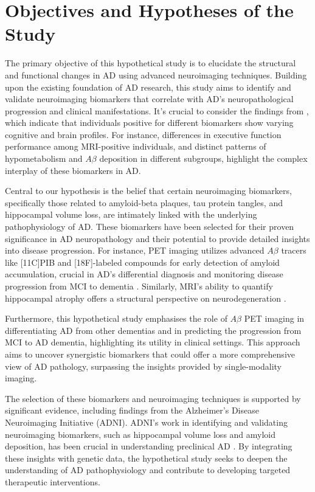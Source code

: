 \documentclass[10pt]{article}
\begin{document}
\begin{sloppypar}
  \section{Objectives and Hypotheses of the Study}
  \label{sec:objectives-and-hypotheses}

  The primary objective of this hypothetical study is to elucidate the structural and functional changes in AD using advanced neuroimaging techniques. Building upon the existing foundation of AD research, this study aims to identify and validate neuroimaging biomarkers that correlate with AD’s neuropathological progression and clinical manifestations. It's crucial to consider the findings from \cite{besson_cognitive_2015}, which indicate that individuals positive for different biomarkers show varying cognitive and brain profiles. For instance, differences in executive function performance among MRI-positive individuals, and distinct patterns of hypometabolism and $A\beta$ deposition in different subgroups, highlight the complex interplay of these biomarkers in AD.

  Central to our hypothesis is the belief that certain neuroimaging biomarkers, specifically those related to amyloid-beta plaques, tau protein tangles, and hippocampal volume loss, are intimately linked with the underlying pathophysiology of AD. These biomarkers have been selected for their proven significance in AD neuropathology and their potential to provide detailed insights into disease progression. For instance, PET imaging utilizes advanced $A\beta$ tracers like [11C]PIB and [18F]-labeled compounds for early detection of amyloid accumulation, crucial in AD's differential diagnosis and monitoring disease progression from MCI to dementia \citep{bao_pet_2021}. Similarly, MRI’s ability to quantify hippocampal atrophy offers a structural perspective on neurodegeneration \citep{besson_cognitive_2015}.

  Furthermore, this hypothetical study emphasises the role of $A\beta$ PET imaging in differentiating AD from other dementias and in predicting the progression from MCI to AD dementia, highlighting its utility in clinical settings. This approach aims to uncover synergistic biomarkers that could offer a more comprehensive view of AD pathology, surpassing the insights provided by single-modality imaging.

  The selection of these biomarkers and neuroimaging techniques is supported by significant evidence, including findings from the Alzheimer’s Disease Neuroimaging Initiative (ADNI). ADNI’s work in identifying and validating neuroimaging biomarkers, such as hippocampal volume loss and amyloid deposition, has been crucial in understanding preclinical AD \citep{saykin_genetic_2015}. By integrating these insights with genetic data, the hypothetical study seeks to deepen the understanding of AD pathophysiology and contribute to developing targeted therapeutic interventions.


\end{sloppypar}
\end{document}
